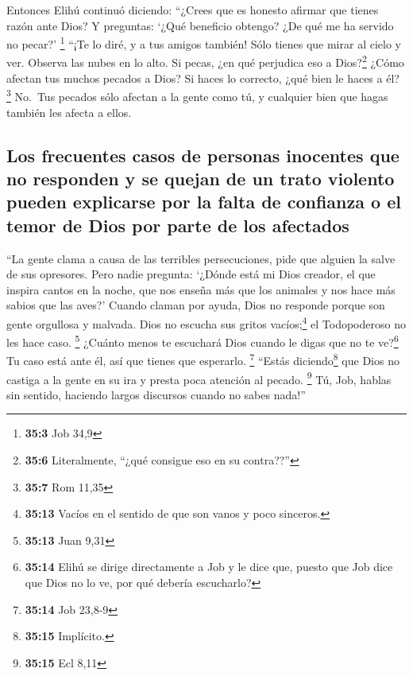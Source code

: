  Entonces Elihú continuó diciendo:  ``¿Crees
que es honesto afirmar que tienes razón ante Dios?  Y
preguntas: `¿Qué beneficio obtengo? ¿De qué me ha servido no pecar?'
\footnote{\textbf{35:3} Job 34,9}  ``¡Te lo diré, y a tus
amigos también!  Sólo tienes que mirar al cielo y ver.
Observa las nubes en lo alto.  Si pecas, ¿en qué perjudica
eso a Dios?\footnote{\textbf{35:6} Literalmente, ``¿qué consigue eso en
  su contra??''} ¿Cómo afectan tus muchos pecados a Dios? 
Si haces lo correcto, ¿qué bien le haces a él? \footnote{\textbf{35:7}
  Rom 11,35}  No.~Tus pecados sólo afectan a la gente como
tú, y cualquier bien que hagas también les afecta a ellos.

\hypertarget{los-frecuentes-casos-de-personas-inocentes-que-no-responden-y-se-quejan-de-un-trato-violento-pueden-explicarse-por-la-falta-de-confianza-o-el-temor-de-dios-por-parte-de-los-afectados}{%
\subsection{Los frecuentes casos de personas inocentes que no responden
y se quejan de un trato violento pueden explicarse por la falta de
confianza o el temor de Dios por parte de los
afectados}\label{los-frecuentes-casos-de-personas-inocentes-que-no-responden-y-se-quejan-de-un-trato-violento-pueden-explicarse-por-la-falta-de-confianza-o-el-temor-de-dios-por-parte-de-los-afectados}}

 ``La gente clama a causa de las terribles persecuciones,
pide que alguien la salve de sus opresores.  Pero nadie
pregunta: `¿Dónde está mi Dios creador, el que inspira cantos en la
noche,  que nos enseña más que los animales y nos hace
más sabios que las aves?'  Cuando claman por ayuda, Dios
no responde porque son gente orgullosa y malvada.  Dios
no escucha sus gritos vacíos;\footnote{\textbf{35:13} Vacíos en el
  sentido de que son vanos y poco sinceros.} el Todopoderoso no les hace
caso. \footnote{\textbf{35:13} Juan 9,31}  ¿Cuánto menos
te escuchará Dios cuando le digas que no te ve?\footnote{\textbf{35:14}
  Elihú se dirige directamente a Job y le dice que, puesto que Job dice
  que Dios no lo ve, por qué debería escucharlo?} Tu caso está ante él,
así que tienes que esperarlo. \footnote{\textbf{35:14} Job 23,8-9}
 ``Estás diciendo\footnote{\textbf{35:15} Implícito.} que
Dios no castiga a la gente en su ira y presta poca atención al pecado.
\footnote{\textbf{35:15} Ecl 8,11}  Tú, Job, hablas sin
sentido, haciendo largos discursos cuando no sabes nada!''

